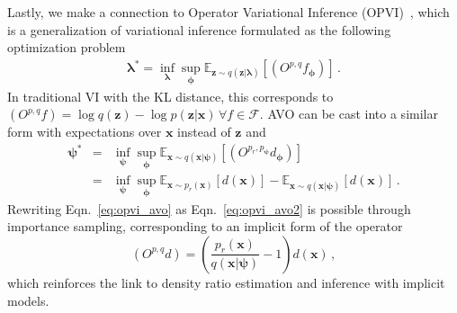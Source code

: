 \documentclass[twocolumn,superscriptaddress,aps]{revtex4-1}
\newcommand{\bfpsi}{{\bm \psi}}
\newcommand{\bfphi}{{\bm \phi}}
\newcommand{\bflambda}{{\bm \lambda}}
\newcommand{\bfx}{\mathbf{x}}
\newcommand{\bfz}{\mathbf{z}}
\theoremstyle{plain}
\begin{document}

Lastly, we make a connection to Operator Variational Inference (OPVI)~\citep{2016arXiv161009033R},
which is a generalization of variational inference formulated as the following optimization problem
\begin{eqnarray}
\bflambda^* = \inf_\bflambda \sup_\bfphi \mathbb{E}_{ \bfz \sim q( \bfz | \bflambda)} [ (O^{p,q} f_\bfphi) ] \, .
\end{eqnarray}
In traditional VI with the KL distance, this corresponds to $(O^{p,q} f) = \log q(\bfz) - \log p(\bfz|\bfx) \, \forall f \in \mathcal{F}$.
AVO can be cast into a similar form with expectations over $\bfx$ instead of $\bfz$ and
\begin{eqnarray} \label{eq:opvi_avo}
\bfpsi^* &=& \inf_\bfpsi \sup_\bfphi \mathbb{E}_{ \bfx \sim q( \bfx | \bfpsi)} [ (O^{p_r,p_\bfpsi} d_\bfphi) ] \\\
\label{eq:opvi_avo2} &=&  \inf_\bfpsi \sup_\bfphi\mathbb{E}_{\bfx\sim p_r(\bfx)}[d(\bfx)] - \mathbb{E}_{\bfx \sim q(\bfx|\bfpsi)}[d(\bfx)] \, .
\end{eqnarray}
Rewriting Eqn.~\ref{eq:opvi_avo} as Eqn.~\ref{eq:opvi_avo2} is possible through importance sampling,
corresponding to an implicit form of the operator
\begin{equation}
(O^{p,q} d) = \left( \frac{p_r(\bfx)}{q(\bfx|\bfpsi)}  -1 \right) d(\bfx) \, ,
\end{equation}
which reinforces the link to density ratio estimation and inference with implicit models.
\end{document}
